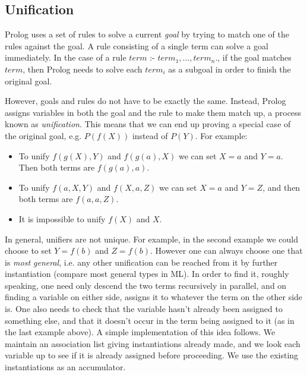 \subsection{Unification}

Prolog uses a set of rules to solve a current {\em goal} by trying to match one
of the rules against the goal. A rule consisting of a single term can solve a
goal immediately. In the case of a rule $term \mbox{ :- }
term_1,\ldots,term_n\mbox{.}$, if the goal matches $term$, then Prolog needs to
solve each $term_i$ as a subgoal in order to finish the original goal.

However, goals and rules do not have to be exactly the same. Instead, Prolog
assigns variables in both the goal and the rule to make them match up, a
process known as {\em unification}. This means that we can end up proving a
special case of the original goal, e.g. $P(f(X))$ instead of
$P(Y)$. For example:

\begin{itemize}

\item To unify $f(g(X),Y)$ and $f(g(a),X)$ we can set
$X = a$ and $Y = a$. Then both terms are $f(g(a),a)$.

\item To unify $f(a,X,Y)$ and $f(X,a,Z)$ we can set $X
= a$ and $Y = Z$, and then both terms are $f(a,a,Z)$.

\item It is impossible to unify $f(X)$ and $X$.

\end{itemize}

In general, unifiers are not unique. For example, in the second example we
could choose to set $Y = f(b)$ and $Z = f(b)$. However one can always choose
one that is {\em most general}, i.e. any other unification can be reached from
it by further instantiation (compare most general types in ML). In order to
find it, roughly speaking, one need only descend the two terms recursively
in parallel, and on finding a variable on either side, assigns it to whatever
the term on the other side is. One also needs to check that the variable hasn't
already been assigned to something else, and that it doesn't occur in the term
being assigned to it (as in the last example above). A simple implementation of
this idea follows. We maintain an association list giving instantiations
already made, and we look each variable up to see if it is already assigned
before proceeding. We use the existing instantiations as an accumulator.

